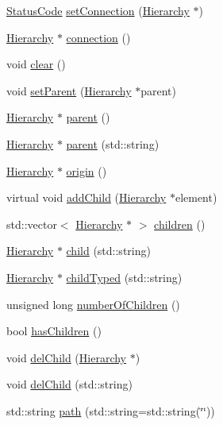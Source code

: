 \begin{DoxyCompactItemize}
\item 
\hyperlink{classStatusCode}{StatusCode} \hyperlink{classElement_ab476b4b1df5954141ceb14f072433b89}{setConnection} (\hyperlink{classHierarchy}{Hierarchy} $\ast$)
\item 
\hyperlink{classHierarchy}{Hierarchy} $\ast$ \hyperlink{classElement_af57444353c1ddf9fa0109801e97debf7}{connection} ()
\item 
void \hyperlink{classHierarchy_af4d43b0765b402670eed2d62c73405af}{clear} ()
\item 
void \hyperlink{classHierarchy_a585ad1aeec16077a0e532ab8b4fc557b}{setParent} (\hyperlink{classHierarchy}{Hierarchy} $\ast$parent)
\item 
\hyperlink{classHierarchy}{Hierarchy} $\ast$ \hyperlink{classHierarchy_a1c7bec8257e717f9c1465e06ebf845fc}{parent} ()
\item 
\hyperlink{classHierarchy}{Hierarchy} $\ast$ \hyperlink{classHierarchy_ad550588733bf75ac5c0fcfd7c8fd11a6}{parent} (std::string)
\item 
\hyperlink{classHierarchy}{Hierarchy} $\ast$ \hyperlink{classHierarchy_aee461dc930ce3871636ff87f075b1b83}{origin} ()
\item 
virtual void \hyperlink{classHierarchy_ad677774ff38fcb257c04a3a10d471fac}{addChild} (\hyperlink{classHierarchy}{Hierarchy} $\ast$element)
\item 
std::vector$<$ \hyperlink{classHierarchy}{Hierarchy} $\ast$ $>$ \hyperlink{classHierarchy_aa9a76f69e98e052ee1a6e32cea006288}{children} ()
\item 
\hyperlink{classHierarchy}{Hierarchy} $\ast$ \hyperlink{classHierarchy_a1e207f973c694b538bf90107b4868817}{child} (std::string)
\item 
\hyperlink{classHierarchy}{Hierarchy} $\ast$ \hyperlink{classHierarchy_a0c15a5276a3b80b4354d6bd8a01e0708}{childTyped} (std::string)
\item 
unsigned long \hyperlink{classHierarchy_ab16e84de65fd84e14001a6cf941c8be4}{numberOfChildren} ()
\item 
bool \hyperlink{classHierarchy_a255174fe4d316d2a3f430dcb9dab29f1}{hasChildren} ()
\item 
void \hyperlink{classHierarchy_a2b2b359fac003233f65786a616766bde}{delChild} (\hyperlink{classHierarchy}{Hierarchy} $\ast$)
\item 
void \hyperlink{classHierarchy_a1928ac7615fe0b5e55cd707f70dc6781}{delChild} (std::string)
\item 
std::string \hyperlink{classHierarchy_aa7990fa7caf132d83e361ce033c6c65a}{path} (std::string=std::string(\char`\"{}\char`\"{}))

\end{DoxyCompactItemize}
